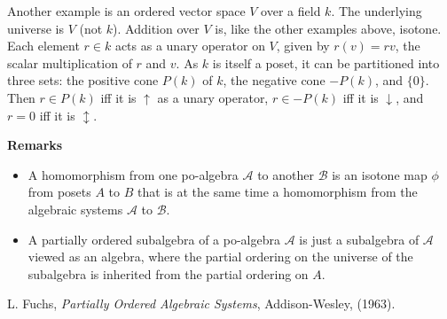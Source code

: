 \documentclass[12pt]{article}
\begin{document}
Another example is an ordered vector space $V$ over a field $k$.  The underlying universe is $V$ (not $k$).  Addition over $V$ is, like the other examples above, isotone.  Each element $r\in k$ acts as a unary operator on $V$, given by $r(v)=rv$, the scalar multiplication of $r$ and $v$.  As $k$ is itself a poset, it can be partitioned into three sets: the positive cone $P(k)$ of $k$, the negative cone $-P(k)$, and $\lbrace 0\rbrace$.  Then $r\in P(k)$ iff it is $\uparrow$ as a unary operator, $r\in -P(k)$ iff it is $\downarrow$, and $r=0$ iff it is $\updownarrow$.

\textbf{Remarks}
\begin{itemize}
\item A homomorphism from one po-algebra $\mathcal{A}$ to another $\mathcal{B}$ is an isotone map $\phi$ from posets $A$ to $B$ that is at the same time a homomorphism from the algebraic systems $\mathcal{A}$ to $\mathcal{B}$.
\item A partially ordered subalgebra of a po-algebra $\mathcal{A}$ is just a subalgebra of $\mathcal{A}$ viewed as an algebra, where the partial ordering on the universe of the subalgebra is inherited from the partial ordering on $A$.
\end{itemize}

\begin{thebibliography}{9}
 L. Fuchs, {\em Partially Ordered Algebraic Systems}, Addison-Wesley, (1963).
\end{thebibliography}
\end{document}
